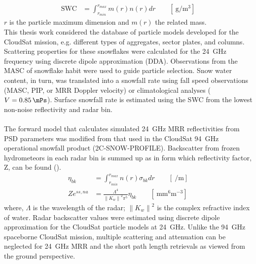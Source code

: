 %
\begin{align}
	\text{SWC} & = \int_{r_{min}}^{r_{max}} m(r) n(r) dr \qquad [\SI{}{\gram\per\cubic\metre}] \label{eq:SWC}
\end{align}
$r$ is the particle maximum dimension and $m(r)$ the related mass. 
\\
This thesis work considered the database of particle models developed for the CloudSat mission, e.g. different types of aggregates, sector plates, and columns. Scattering properties for these snowflakes were calculated for the \SI{24}{\giga\hertz} frequency using discrete dipole approximation (DDA). Observations from the MASC of snowflake habit were used to guide particle selection. Snow water content, in turn, was translated into a snowfall rate using fall speed observations (MASC, PIP, or MRR Doppler velocity) or climatological analyses ($V = \SI{0.85}{\mPs}$). Surface snowfall rate is estimated using the SWC from the lowest non-noise reflectivity and radar bin. 
\\
\\
The forward model that calculates simulated \SI{24}{\giga\hertz} MRR reflectivities from PSD parameters was modified from that used in the CloudSat \SI{94}{\giga\hertz} operational snowfall product (2C-SNOW-PROFILE). Backscatter from frozen hydrometeors in each radar bin is summed up as in  form which reflectivity factor, Z, can be found (). 
\begin{align}
	\eta_{bk} & = \int_{r_{min}}^{r_{max}} n(r) \sigma_{bk} dr \qquad [\SI{}{\per\metre}] \label{eq:backscatter} \\
	Ze^{ss,na} & = \frac{\Lambda^4}{\left\| K_w \right\|^2 \pi^5} \eta_{bk} \qquad [\SI{}{\mm^6\metre^{-3}}] \label{eq:singleZ}
\end{align}
where, $\Lambda$ is the wavelength of the radar; $\left\| K_w \right\|^2$ is the complex refractive index of water. Radar backscatter values were estimated using discrete dipole approximation for the CloudSat particle models at \SI{24}{\giga\hertz}. Unlike the \SI{94}{\giga\hertz} spaceborne CloudSat mission, multiple scattering and attenuation can be neglected for \SI{24}{\giga\hertz} MRR and the short path length retrievals as viewed from the ground perspective.  

